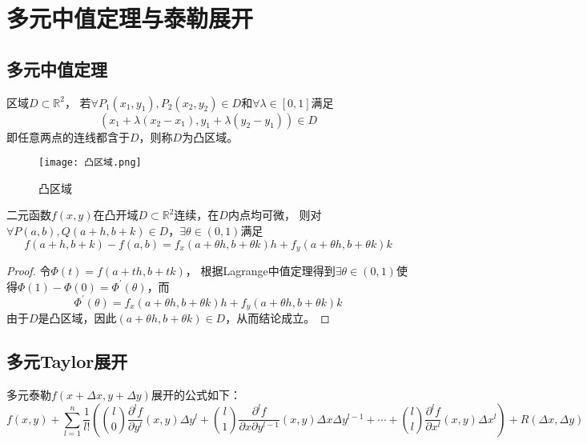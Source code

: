 \section{多元中值定理与泰勒展开}

\subsection{多元中值定理}

\begin{definition}[凸区域]
  区域$D \subset \mathbb{R}^2$，
  若$\forall P_1(x_1,y_1), P_2(x_2,y_2) \in D$和$\forall \lambda \in [0,1]$满足
  \begin{equation*}
    (x_1 + \lambda(x_2 - x_1), y_1 + \lambda(y_2 - y_1)) \in D
  \end{equation*}
  即任意两点的连线都含于$D$，则称$D$为凸区域。
\end{definition}

\begin{figure}[htp]
  \centering
  \texttt{[image: 凸区域.png]}
  \caption{凸区域}
\end{figure}

\begin{theorem}[多元中值定理]
  二元函数$f(x,y)$在凸开域$D \subset \mathbb{R}^2$连续，在$D$内点均可微，
  则对$\forall P(a,b), Q(a + h, b + k) \in D$，$\exists \theta \in (0,1)$满足
  \begin{equation*}
    f(a+h,b+k) -f(a,b) = f_x(a + \theta h, b + \theta k)h + f_y(a+\theta h, b + \theta k)k
  \end{equation*}
\end{theorem}

\begin{proof}
  令$\Phi(t) = f(a + th, b + tk)$，
  根据Lagrange中值定理得到$\exists \theta \in (0,1)$使得$\Phi(1) - \Phi(0) = \Phi^{\prime}(\theta)$，而
  \begin{equation*}
    \Phi^{\prime}(\theta) = f_x(a + \theta h, b + \theta k)h + f_y(a + \theta h, b + \theta k)k
  \end{equation*}
  由于$D$是凸区域，因此$(a + \theta h, b + \theta k ) \in D$，从而结论成立。
\end{proof}

\subsection{多元Taylor展开}

\begin{theorem}[多元Taylor展开]
  多元泰勒$f(x + \Delta x, y + \Delta y)$展开的公式如下：
  \begin{equation*}
    f(x,y) + \sum\limits_{l = 1}^n \frac{1}{l!}\left( {l \choose 0} \frac{\partial ^l f}{\partial y^l}(x,y) \Delta y^l + {l \choose 1}\frac{\partial^l f}{\partial x \partial y^{l-1}}(x,y)\Delta x \Delta y^{l-1} + \cdots + {l \choose l }\frac{\partial^l f}{\partial  x^l}(x,y) \Delta x^l\right) + R(\Delta x,\Delta y)
  \end{equation*}
\end{theorem}

